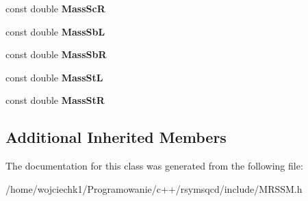 \begin{DoxyCompactItemize}
const double {\bfseries Mass\+ScR}
\item 
\mbox{\label{classMRSSM_ad86ae120c917f88aa7c8934d1fef2578}} 
const double {\bfseries Mass\+SbL}
\item 
\mbox{\label{classMRSSM_afd5778cd739891671f08595ec86e31aa}} 
const double {\bfseries Mass\+SbR}
\item 
\mbox{\label{classMRSSM_ab3ae713607144c4b30a37fde2c32e468}} 
const double {\bfseries Mass\+StL}
\item 
\mbox{\label{classMRSSM_ac4c1a53eece41e0cfd7ae40b21ee8523}} 
const double {\bfseries Mass\+StR}
\end{DoxyCompactItemize}
\subsection*{Additional Inherited Members}


The documentation for this class was generated from the following file\+:\begin{DoxyCompactItemize}
\item 
/home/wojciechk1/\+Programowanie/c++/rsymsqcd/include/M\+R\+S\+S\+M.\+h\end{DoxyCompactItemize}

